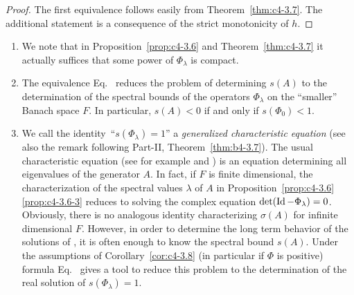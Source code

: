 \begin{proof}
The first equivalence follows easily from Theorem~\ref{thm:c4-3.7}. 
The additional statement is a consequence of the strict monotonicity of\/ $h$.
\end{proof}
\begin{remarks*}\label{rem:c4-3.0-kgk}
%
\begin{enumerate}[\upshape (i), wide, labelindent=.25em] 
\item \label{rem:c4-3.1-1}
We note that in Proposition~\ref{prop:c4-3.6} and Theorem~\ref{thm:c4-3.7} it actually suffices that some power of\/ $\Phi_{\lambda}$ is compact.

\item \label{rem:c4-3.1-2}
The equivalence Eq.~ reduces the problem of determining $s(A)$ to the determination of the spectral bounds of the operators $\Phi_{\lambda}$ on the \enquote{smaller} Banach space $F$.
In particular, $s(A) < 0$ if and only if\/ $s(\Phi_{0}) < 1$.

\item \label{rem:c4-3.1-3}
We call the identity\, \enquote{$s(\Phi_{\lambda}) = 1$} a \emph{generalized characteristic equation} (see also the remark following Part-II, Theorem~\ref{thm:b4-3.7}). The usual characteristic equation (see for example  \textcite[p.168ff]{hale:1977} and \textcite[Section~5]{heijmans:1985b})
is an equation determining all eigenvalues of the generator $A$. 
In fact, if\/ $F$ is finite dimensional, the characterization of the spectral values $\lambda$ of\/ $A$ in Proposition~\ref{prop:c4-3.6}\,\ref{prop:c4-3.6-3} reduces to solving the complex equation $\det(\operatorname{Id} - \Phi_{\lambda}) = 0$. 
Obviously, there is no analogous identity characterizing $\sigma(A)$ for infinite dimensional $F$. 
However, in order to determine the long term behavior of the solutions of , it is often enough to know the spectral bound $s(A)$. 
Under the assumptions of Corollary~\ref{cor:c4-3.8} (in particular if\/ $\Phi$ is positive) formula Eq.~ gives a tool to reduce this problem to the determination of the real solution of\/ $s(\Phi_{\lambda}) = 1$.
\end{enumerate}
\end{remarks*}

